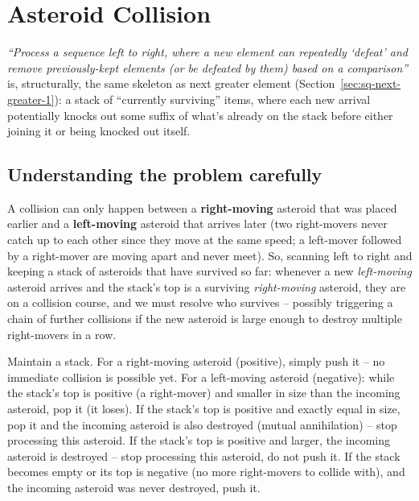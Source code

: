 \section{Asteroid Collision}
\label{sec:sq-asteroid-collision}


\begin{patternbox}
\emph{``Process a sequence left to right, where a new element can
repeatedly `defeat' and remove previously-kept elements (or be defeated
by them) based on a comparison''} is, structurally, the same skeleton as
next greater element (Section~\ref{sec:sq-next-greater-1}): a stack of
``currently surviving'' items, where each new arrival potentially knocks
out some suffix of what's already on the stack before either joining it
or being knocked out itself.
\end{patternbox}

\subsection*{Understanding the problem carefully}

A collision can only happen between a \textbf{right-moving} asteroid that
was placed earlier and a \textbf{left-moving} asteroid that arrives later
(two right-movers never catch up to each other since they move at the
same speed; a left-mover followed by a right-mover are moving apart and
never meet). So, scanning left to right and keeping a stack of asteroids
that have survived so far: whenever a new \emph{left-moving} asteroid
arrives and the stack's top is a surviving \emph{right-moving} asteroid,
they are on a collision course, and we must resolve who survives --
possibly triggering a chain of further collisions if the new asteroid is
large enough to destroy multiple right-movers in a row.

\begin{ideabox}
Maintain a stack. For a right-moving asteroid (positive), simply push it
-- no immediate collision is possible yet. For a left-moving asteroid
(negative): while the stack's top is positive (a right-mover) and smaller
in size than the incoming asteroid, pop it (it loses). If the stack's
top is positive and exactly equal in size, pop it and the incoming
asteroid is also destroyed (mutual annihilation) -- stop processing this
asteroid. If the stack's top is positive and larger, the incoming asteroid
is destroyed -- stop processing this asteroid, do not push it. If the
stack becomes empty or its top is negative (no more right-movers to
collide with), and the incoming asteroid was never destroyed, push it.
\end{ideabox}

